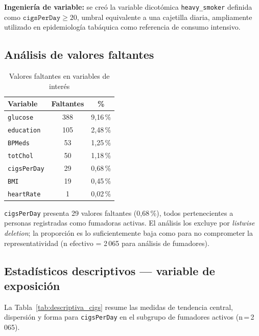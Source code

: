 \documentclass[11pt,a4paper]{article}
\begin{document}
\textbf{Ingeniería de variable:} se creó la variable dicotómica \texttt{heavy\_smoker}
definida como $\texttt{cigsPerDay} \geq 20$, umbral equivalente a una cajetilla diaria,
ampliamente utilizado en epidemiología tabáquica como referencia de consumo intensivo.

\subsection{Análisis de valores faltantes}

\begin{table}[H]
\centering
\caption{Valores faltantes en variables de interés}
\vspace{0.3em}
\begin{tabular}{lcc}
\toprule
\textbf{Variable} & \textbf{Faltantes} & \textbf{\%} \\
\midrule
\texttt{glucose}    & 388 & 9{,}16\,\% \\
\texttt{education}  & 105 & 2{,}48\,\% \\
\texttt{BPMeds}     &  53 & 1{,}25\,\% \\
\texttt{totChol}    &  50 & 1{,}18\,\% \\
\texttt{cigsPerDay} &  29 & 0{,}68\,\% \\
\texttt{BMI}        &  19 & 0{,}45\,\% \\
\texttt{heartRate}  &   1 & 0{,}02\,\% \\
\bottomrule
\end{tabular}
\end{table}

\texttt{cigsPerDay} presenta 29 valores faltantes (0{,}68\,\%), todos pertenecientes
a personas registradas como fumadoras activas. El análisis los excluye por
\textit{listwise deletion}; la proporción es lo suficientemente baja como para
no comprometer la representatividad (n efectivo = 2\,065 para análisis de fumadores).

\subsection{Estadísticos descriptivos — variable de exposición}

La Tabla~\ref{tab:descriptiva_cigs} resume las medidas de tendencia central,
dispersión y forma para \texttt{cigsPerDay} en el subgrupo de fumadores activos
(n\,=\,2\,065).
\end{document}
